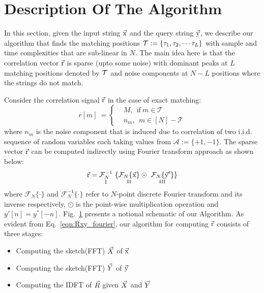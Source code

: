 \section{Description Of The Algorithm}
\label{sec:Algo_desc}
In this section, given the input string $\vec{\mathrm{x}}$ and the query string $\vec{\mathrm{y}}$, we describe our algorithm that finds the matching positions $\mathcal{T}\mathrel{\mathop:}= \{\tau_1, \tau_2, \cdots \tau_L\}$ with sample and time complexities that are sub-linear in $N$. The main idea here is that the correlation vector $\vec{\mathrm{r}}$ is sparse (upto some noise) with dominant peaks at $L$ matching positions denoted by $\mathcal{T}$ and noise components at $N-L$ positions where the strings do not match. 

\begin{figure}[h!]
	\begin{center}
	 	\resizebox{0.75\textwidth}{!}{}	
	\end{center}	   
	\caption{}\label{fig:notional}
	\vspace{5 pt}
\end{figure}

Consider the correlation signal $\vec{\mathrm{r}}$ in the case of exact matching:
\begin{equation} \label{eqn:RXY_sparse}
r[m] \ = \left\{
\begin{array}{ll}
  &M,~~  \text{if} \ m \in \mathcal{T} \\
  & n_m,~~ m \in [N]-\mathcal{T}
\end{array} 
\right.  
\end{equation}
where $n_m$ is the noise component that is induced due to correlation of two i.i.d. sequence of random variables each taking values from $\mathcal{A} := \{+1,-1\}$. The sparse vector $\vec{\mathrm{r}}$ can be computed indirectly using Fourier transform approach as shown below:
\begin{equation}\label{eqn:Rxy_fourier}
  \rv = \underset{\text{ \RNum{1} } } {\mathcal{F}_{N}^{-1}} \ \{ \underset{\text{ \RNum{2} } }{  \mathcal{F}_{N}\{\xv\}}  \odot \ \underset{\text{ \RNum{3} } }{ \mathcal{F}_{N}\{\yv'\}}  \} 
\end{equation} 
where $\mathcal{F}_{N}\{ \cdot \}$ and $\mathcal{F}_{N}^{-1}\{ \cdot \}$ refer to $N$-point discrete Fourier transform and its inverse respectively, $\odot$ is the point-wise multiplication operation and ${ y'[n]} = { y^{*}[-n]}$. Fig.~\ref{fig:notional} presents a notional schematic of our Algorithm. As evident from Eq.~\eqref{eqn:Rxy_fourier}, our algorithm for computing $\vec{\mathrm{r}}$ consists of three stages:
\begin{itemize}
\item Computing the sketch(FFT) $\vec{X}$ of $\vec{\mathrm{x}}$
\item Computing the sketch(FFT) $\vec{Y}$ of $\vec{\mathrm{y}}$
\item Computing the IDFT of $\vec{R}$ given $\vec{X}$ and $\vec{Y}$
\end{itemize}


